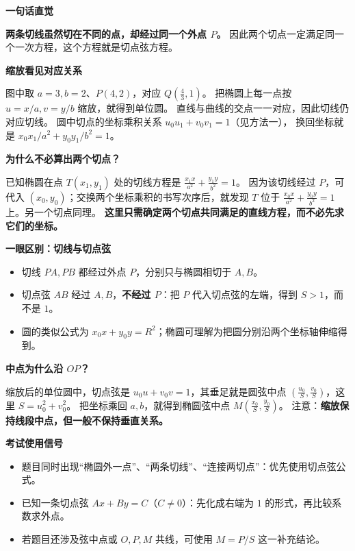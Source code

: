 \begin{explanationbox}
    \textbf{\textcolor{CExplanation}{一句话直觉}}

    \textbf{两条切线虽然切在不同的点，却经过同一个外点 $P$。}
    因此两个切点一定满足同一个一次方程，这个方程就是切点弦方程。

    \medskip
    \textbf{\textcolor{CExplanation}{缩放看见对应关系}}



    图中取 $a=3,b=2$、$P(4,2)$，对应 $Q(\frac43,1)$。
    把椭圆上每一点按 $u=x/a,v=y/b$ 缩放，就得到单位圆。
    直线与曲线的交点一一对应，因此切线仍对应切线。
    圆中切点的坐标乘积关系 $u_0u_1+v_0v_1=1$（见方法一），
    换回坐标就是 $x_0x_1/a^2+y_0y_1/b^2=1$。

    \medskip
    \textbf{\textcolor{CExplanation}{为什么不必算出两个切点？}}

    已知椭圆在点 $T(x_1,y_1)$ 处的切线方程是
    $\frac{x_1x}{a^2}+\frac{y_1y}{b^2}=1$。
    因为该切线经过 $P$，可代入 $(x_0,y_0)$；交换两个坐标乘积的书写次序后，就发现 $T$ 位于
    $\frac{x_0x}{a^2}+\frac{y_0y}{b^2}=1$ 上。另一个切点同理。
    \textbf{这里只需确定两个切点共同满足的直线方程，而不必先求它们的坐标。}

    \medskip
    \textbf{\textcolor{CExplanation}{一眼区别：切线与切点弦}}
    \begin{itemize}[leftmargin=*, itemsep=0.35em]
        \item 切线 $PA,PB$ 都经过外点 $P$，分别只与椭圆相切于 $A,B$。
        \item 切点弦 $AB$ 经过 $A,B$，\textbf{不经过 $P$}：把 $P$ 代入切点弦的左端，得到 $S>1$，而不是 $1$。
        \item 圆的类似公式为 $x_0x+y_0y=R^2$；椭圆可理解为把圆分别沿两个坐标轴伸缩得到。
    \end{itemize}

    \medskip
    \textbf{\textcolor{CExplanation}{中点为什么沿 $OP$？}}

    缩放后的单位圆中，切点弦是 $u_0u+v_0v=1$，其垂足就是圆弦中点
    $\left(\frac{u_0}{S},\frac{v_0}{S}\right)$，这里 $S=u_0^2+v_0^2$。
    把坐标乘回 $a,b$，就得到椭圆弦中点
    $M\left(\frac{x_0}{S},\frac{y_0}{S}\right)$。
    注意：\textbf{缩放保持线段中点，但一般不保持垂直关系。}

    \medskip
    \textbf{\textcolor{CExplanation}{考试使用信号}}
    \begin{itemize}[leftmargin=*, itemsep=0.3em]
        \item 题目同时出现``椭圆外一点''、``两条切线''、``连接两切点''：优先使用切点弦公式。
        \item 已知一条切点弦 $Ax+By=C$（$C\ne0$）：先化成右端为 $1$ 的形式，再比较系数求外点。
        \item 若题目还涉及弦中点或 $O,P,M$ 共线，可使用 $M=P/S$ 这一补充结论。
    \end{itemize}
\end{explanationbox}

